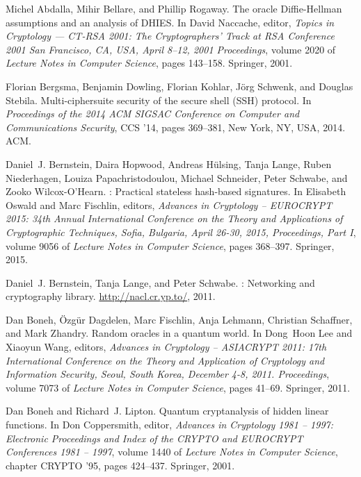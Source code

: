 \documentclass[USenglish,oneside,twocolumn]{article}
\theoremstyle{dgthm}
\theoremstyle{dgdef}
\begin{document}

\begin{thebibliography}{10}

Michel Abdalla, Mihir Bellare, and Phillip Rogaway.
\newblock The oracle {Diffie}-{Hellman} assumptions and an analysis of {DHIES}.
\newblock In David Naccache, editor, {\em Topics in {Cryptology} --- {CT}-{RSA}
  2001: The Cryptographers' Track at RSA Conference 2001 San Francisco, CA,
  USA, April 8--12, 2001 Proceedings}, volume 2020 of {\em Lecture {Notes} in
  {Computer} {Science}}, pages 143--158. Springer, 2001.

Florian Bergsma, Benjamin Dowling, Florian Kohlar, J{\"o}rg Schwenk, and
  Douglas Stebila.
\newblock Multi-ciphersuite security of the secure shell ({SSH}) protocol.
\newblock In {\em Proceedings of the 2014 {ACM} {SIGSAC} {Conference} on
  {Computer} and {Communications} {Security}}, {CCS} '14, pages 369--381, New
  York, NY, USA, 2014. ACM.

Daniel~J. Bernstein, Daira Hopwood, Andreas H\"ulsing, Tanja Lange, Ruben
  Niederhagen, Louiza Papachristodoulou, Michael Schneider, Peter Schwabe, and
  Zooko Wilcox-O'Hearn.
: {Practical} stateless hash-based signatures.
\newblock In Elisabeth Oswald and Marc Fischlin, editors, {\em Advances in
  {Cryptology} -- {EUROCRYPT} 2015: 34th Annual International Conference on the
  Theory and Applications of Cryptographic Techniques, Sofia, Bulgaria, April
  26-30, 2015, Proceedings, Part I}, volume 9056 of {\em Lecture {Notes} in
  {Computer} {Science}}, pages 368--397. Springer, 2015.

Daniel~J. Bernstein, Tanja Lange, and Peter Schwabe.
: Networking and cryptography library.
\newblock \url{http://nacl.cr.yp.to/}, 2011.

Dan Boneh, {\"O}zg{\"u}r Dagdelen, Marc Fischlin, Anja Lehmann, Christian
  Schaffner, and Mark Zhandry.
\newblock Random oracles in a quantum world.
\newblock In Dong~Hoon Lee and Xiaoyun Wang, editors, {\em Advances in
  {Cryptology} -- {ASIACRYPT} 2011: 17th International Conference on the Theory
  and Application of Cryptology and Information Security, Seoul, South Korea,
  December 4-8, 2011. Proceedings}, volume 7073 of {\em Lecture {Notes} in
  {Computer} {Science}}, pages 41--69. Springer, 2011.

Dan Boneh and Richard~J. Lipton.
\newblock Quantum cryptanalysis of hidden linear functions.
\newblock In Don Coppersmith, editor, {\em Advances in {Cryptology} 1981 --
  1997: Electronic Proceedings and Index of the CRYPTO and EUROCRYPT
  Conferences 1981 -- 1997}, volume 1440 of {\em Lecture {Notes} in {Computer}
  {Science}}, chapter {CRYPTO} '95, pages 424--437. Springer, 2001.


\end{thebibliography}
\end{document}
